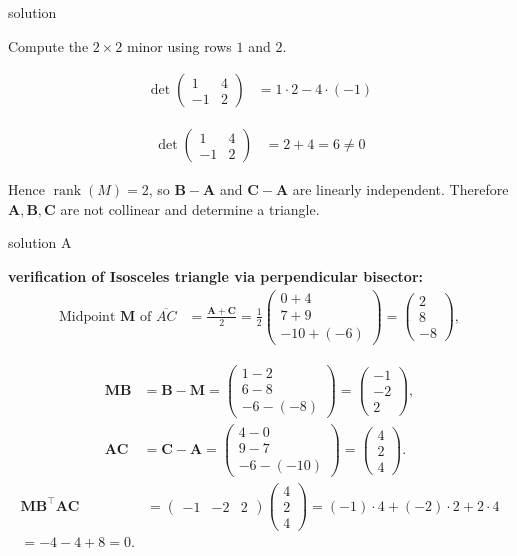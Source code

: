 \documentclass{beamer}
\numberwithin{equation}{section}
\theoremstyle{remark}
\newcommand{\myvec}[1]{\ensuremath{\begin{pmatrix}#1\end{pmatrix}}}
\let\vec\mathbf
\begin{document}
\begin{frame}{solution}

Compute the $2\times2$ minor using rows $1$ and $2$.

\begin{align}
\det\begin{pmatrix}1 & 4\\[4pt] -1 & 2\end{pmatrix}
&= 1\cdot 2 - 4\cdot(-1)
\end{align}

\begin{align}
\det\begin{pmatrix}1 & 4\\[4pt] -1 & 2\end{pmatrix}
&= 2 + 4 = 6 \neq 0
\end{align}

Hence $\operatorname{rank}(M)=2$, so $\vec{B}-\vec{A}$ and $\vec{C}-\vec{A}$ are linearly independent.  
Therefore $\vec{A},\vec{B},\vec{C}$ are not collinear and determine a triangle.



\end{frame}
\begin{frame}{solution A }

\textbf{verification of Isosceles triangle  via perpendicular bisector:}
\begin{align}
\text{Midpoint } \vec{M} \text{ of } \overline{AC}
&= \frac{\vec{A}+\vec{C}}{2}
= \frac{1}{2}\myvec{0+4\\7+9\\-10+(-6)}
= \myvec{2\\8\\-8},
\end{align}

\begin{align}
\vec{MB} &= \vec{B}-\vec{M}
= \myvec{1-2\\6-8\\-6-(-8)}
= \myvec{-1\\-2\\2},\\
\vec{AC} &= \vec{C}-\vec{A}
= \myvec{4-0\\9-7\\-6-(-10)}
= \myvec{4\\2\\4}.
\end{align}
\begin{align}
\vec{MB}^\top \vec{AC}
&= \myvec{-1 & -2 & 2}\myvec{4\\2\\4}
= (-1)\cdot 4 + (-2)\cdot 2 + 2\cdot 4\\
= -4 -4 + 8
= 0.
\end{align}

\end{frame}
\end{document}

